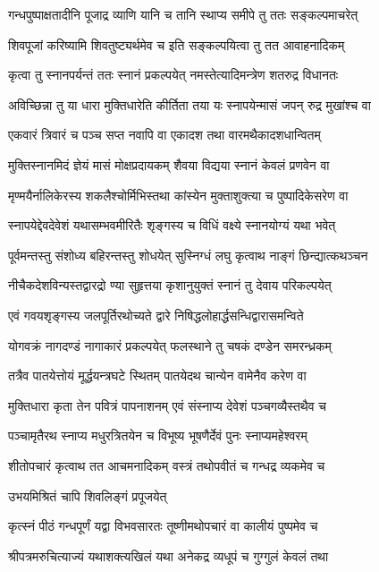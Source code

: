 \twolineshloka
{गन्धपुष्पाक्षतादीनि पूजाद्र व्याणि यानि च}
{तानि स्थाप्य समीपे तु ततः सङ्कल्पमाचरेत्}%

\twolineshloka
{शिवपूजां करिष्यामि शिवतुष्ट्यर्थमेव च}
{इति सङ्कल्पयित्वा तु तत आवाहनादिकम्}%

\twolineshloka
{कृत्वा तु स्नानपर्यन्तं ततः स्नानं प्रकल्पयेत्}
{नमस्तेत्यादिमन्त्रेण शतरुद्र विधानतः}%

\twolineshloka
{अविच्छिन्ना तु या धारा मुक्तिधारेति कीर्तिता}
{तया यः स्नापयेन्मासं जपन् रुद्र मुखांश्च वा}%

\twolineshloka
{एकवारं त्रिवारं च पञ्च सप्त नवापि वा}
{एकादश तथा वारमथैकादशधान्वितम्}%

\twolineshloka
{मुक्तिस्नानमिदं ज्ञेयं मासं मोक्षप्रदायकम्}
{शैवया विद्यया स्नानं केवलं प्रणवेन वा}%

\twolineshloka
{मृण्मयैर्नालिकेरस्य शकलैश्चोर्मिभिस्तथा}
{कांस्येन मुक्ताशुक्त्या च पुष्पादिकेसरेण वा}%

\twolineshloka
{स्नापयेद्देवदेवेशं यथासम्भवमीरितैः}
{शृङ्गस्य च विधिं वक्ष्ये स्नानयोग्यं यथा भवेत्}%

\twolineshloka
{पूर्वमन्तस्तु संशोध्य बहिरन्तस्तु शोधयेत्}
{सुस्निग्धं लघु कृत्वाथ नाङ्गं छिन्द्यात्कथञ्चन}%

\twolineshloka
{नीचैकदेशविन्यस्तद्वारद्रो ण्या सुहृत्तया}
{कृशानुयुक्तं स्नानं तु देवाय परिकल्पयेत्}%

\twolineshloka
{एवं गवयशृङ्गस्य जलपूर्तिरथोच्यते}
{द्वारे निषिद्धलोहार्द्धसन्धिद्वारासमन्विते}%

\twolineshloka
{योगवक्रं नागदण्डं नागाकारं प्रकल्पयेत्}
{फलस्थाने तु चषकं दण्डेन समरन्ध्रकम्}%

\twolineshloka
{तत्रैव पातयेत्तोयं मूर्द्धयन्त्रघटे स्थितम्}
{पातयेदथ चान्येन वामेनैव करेण वा}%

\twolineshloka
{मुक्तिधारा कृता तेन पवित्रं पापनाशनम्}
{एवं संस्नाप्य देवेशं पञ्चगव्यैस्तथैव च}%

\twolineshloka
{पञ्चामृतैरथ स्नाप्य मधुरत्रितयेन च}
{विभूष्य भूषणैर्देवं पुनः स्नाप्यमहेश्वरम्}%

\twolineshloka
{शीतोपचारं कृत्वाथ तत आचमनादिकम्}
{वस्त्रं तथोपवीतं च गन्धद्र व्यकमेव च}%


{उभयमिश्रितं चापि शिवलिङ्गं प्रपूजयेत्}

\twolineshloka
{कृत्स्नं पीठं गन्धपूर्णं यद्वा विभवसारतः}
{तूष्णीमथोपचारं वा कालीयं पुष्पमेव च}%

\twolineshloka
{श्रीपत्रमरुचित्याज्यं यथाशक्त्यखिलं यथा}
{अनेकद्र व्यधूपं च गुग्गुलं केवलं तथा}%

